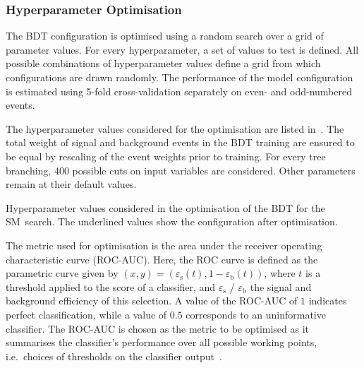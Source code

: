 \subsubsection{Hyperparameter Optimisation}

The BDT configuration is optimised using a random search over a grid
of parameter values. For every hyperparameter, a set of values to test
is defined. All possible combinations of hyperparameter values define
a grid from which configurations are drawn randomly. The performance
of the model configuration is estimated using 5-fold cross-validation
separately on even- and odd-numbered events.

The hyperparameter values considered for the optimisation are listed
in~. The total weight of signal and background
events in the BDT training are ensured to be equal by rescaling of the event
weights prior to training.
For every tree branching, 400 possible cuts on input variables are
considered. Other parameters remain at their default
values.

\begin{table}[htbp]
  \centering

  \caption[Hyperparameter values considered in the optimisation of the BDT for
  the SM~\HH search.]{Hyperparameter values considered in the optimisation of
    the BDT for the SM~\HH search. The underlined values show the configuration
    after optimisation.}%
  \label{tab:hyperparameter_grid_bdt}

  
\end{table}

The metric used for optimisation is the area under the receiver operating
characteristic curve (ROC-AUC). Here, the ROC curve is defined
as the parametric curve given by
$(x, y) = \left( \varepsilon_{\text{s}}(t), 1 -
  \varepsilon_{\text{b}}(t) \right)$, where $t$ is a threshold applied
to the score of a classifier, and $\varepsilon_\text{s}$ /
$\varepsilon_\text{b}$ the signal and background efficiency of this
selection. A value of the ROC-AUC of $1$ indicates perfect
classification, while a value of $0.5$ corresponds to an uninformative
classifier. The ROC-AUC is chosen as the metric to be optimised as it
summarises the classifier's performance over all possible working
points, i.e.\ choices of thresholds on the classifier
output~\cite{james13}.

